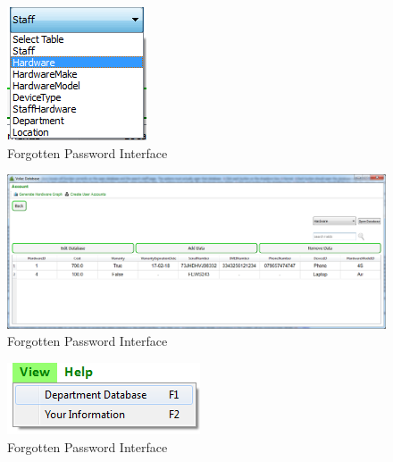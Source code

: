 \begin{figure}[H]
    \includegraphics[width=\textwidth]{./Testing/Images/ComboBoxHardware.png}
    \caption{Forgotten Password Interface} \label{fig:ComboBoxHardware}
\end{figure}

\begin{figure}[H]
    \includegraphics[width=\textwidth]{./Testing/Images/HardwareTableAfterCombo.png}
    \caption{Forgotten Password Interface} \label{fig:HardwareTableAfterCombo}
\end{figure}

\begin{figure}[H]
    \includegraphics[width=\textwidth]{./Testing/Images/DepartmentInformationButton.png}
    \caption{Forgotten Password Interface} \label{fig:DepartmentInformationButton}
\end{figure}

